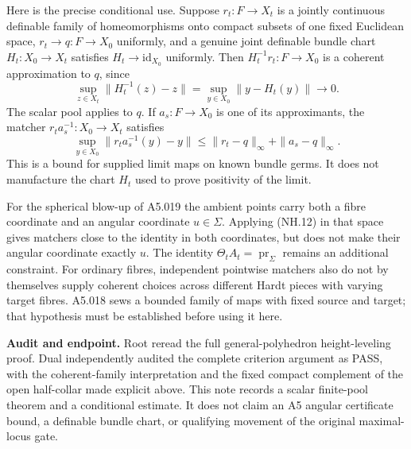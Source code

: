 Here is the precise conditional use. Suppose $r_t:F\to X_t$ is a
jointly continuous definable family of homeomorphisms onto compact
subsets of one fixed Euclidean space,
$r_t\to q:F\to X_0$ uniformly, and a genuine joint definable bundle
chart $H_t:X_0\to X_t$ satisfies $H_t\to\mathrm{id}_{X_0}$ uniformly.
Then $H_t^{-1}r_t:F\to X_0$ is a coherent approximation to $q$, since
\[
 \sup_{z\in X_t}\|H_t^{-1}(z)-z\|
       =\sup_{y\in X_0}\|y-H_t(y)\|\longrightarrow0.            \tag{NH.11}
\]
The scalar pool applies to $q$. If $a_s:F\to X_0$ is one of its
approximants, the matcher $r_ta_s^{-1}:X_0\to X_t$ satisfies
\[
 \sup_{y\in X_0}\|r_ta_s^{-1}(y)-y\|
 \leq \|r_t-q\|_\infty+\|a_s-q\|_\infty.                      \tag{NH.12}
\]
This is a bound for supplied limit maps on known bundle germs. It does
not manufacture the chart $H_t$ used to prove positivity of the limit.

For the spherical blow-up of A5.019 the ambient points carry both a
fibre coordinate and an angular coordinate $u\in\Sigma$. Applying
(NH.12) in that space gives matchers close to the identity in both
coordinates, but does not make their angular coordinate exactly $u$.
The identity $\Theta_tA_t=\operatorname{pr}_{\Sigma}$ remains an
additional constraint. For ordinary fibres, independent pointwise
matchers also do not by themselves supply coherent choices across
different Hardt pieces with varying target fibres. A5.018 sews a
bounded family of maps with fixed source and target; that hypothesis
must be established before using it here.

\textbf{Audit and endpoint.}
Root reread the full general-polyhedron height-leveling proof. Dual
independently audited the complete criterion argument as PASS, with
the coherent-family interpretation and the fixed compact complement
of the open half-collar made explicit above. This note records a
scalar finite-pool theorem and a conditional estimate. It does not
claim an A5 angular certificate bound, a definable bundle chart, or
qualifying movement of the original maximal-locus gate.

